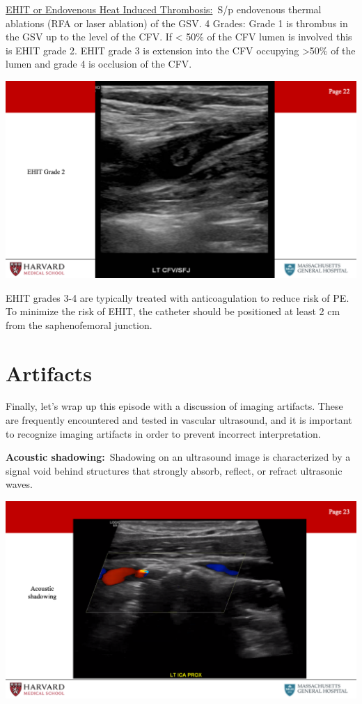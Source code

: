 \documentclass[
]{book}
\begin{document}
\uline{EHIT or Endovenous Heat Induced Thrombosis:}~S/p endovenous
thermal ablations (RFA or laser ablation) of the GSV. 4 Grades: Grade 1
is thrombus in the GSV up to the level of the CFV. If \textless{} 50\% of the CFV
lumen is involved this is EHIT grade 2. EHIT grade 3 is extension into
the CFV occupying \textgreater50\% of the lumen and grade 4 is occlusion of the
CFV.

\includegraphics[width=15.01in]{images/vasc_lab2/Slide23}

EHIT grades 3-4 are typically treated with anticoagulation to reduce
risk of PE. To minimize the risk of EHIT, the catheter should be
positioned at least 2 cm from the saphenofemoral junction.

\hypertarget{artifacts}{%
\section{Artifacts}\label{artifacts}}

Finally, let's wrap up this episode with a discussion of imaging
artifacts. These are frequently encountered and tested in vascular
ultrasound, and it is important to recognize imaging artifacts in order
to prevent incorrect interpretation.

\textbf{Acoustic shadowing:}~Shadowing on an ultrasound image is
characterized by a signal void behind structures that strongly absorb,
reflect, or refract ultrasonic waves.

\includegraphics[width=15.01in]{images/vasc_lab2/Slide24}
\end{document}
